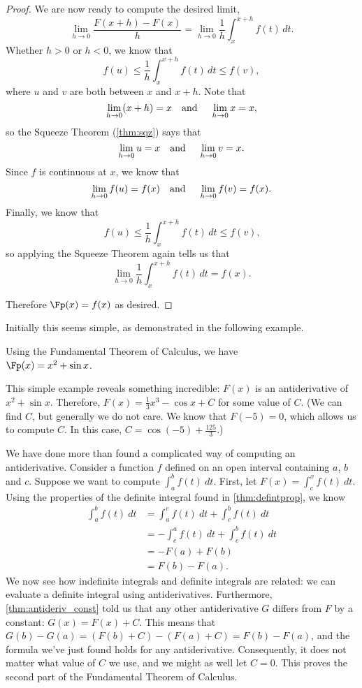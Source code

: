 \begin{proof}
We are now ready to compute the desired limit,
\[\lim_{h\to 0}\frac{F(x+h)-F(x)}{h}=\lim_{h\to 0}\frac1h\int_x^{x+h} f(t)\,dt.\]
Whether $h>0$ or $h<0$, we know that
\[f(u)\leq \frac1h\int_x^{x+h} f(t)\,dt\leq f(v),\]
where $u$ and $v$ are both between $x$ and $x+h$. Note that 
\[\lim_{h\to 0} (x+h)=x \text{\quad and \quad} \lim_{h\to 0} x=x,\]
so the Squeeze Theorem (\autoref{thm:sqz}) says that
\[\lim_{h\to 0}u=x \text{\quad and \quad} \lim_{h\to 0} v=x.\]
Since $f$ is continuous at $x$, we know that
\[\lim_{h\to 0} f(u)=f(x)\text{\quad and \quad} \lim_{h\to 0}f(v)=f(x).\]
Finally, we know that
\[f(u)\leq \frac1h \int_x^{x+h} f(t)\,dt\leq f(v)\text{,}\]
so applying the Squeeze Theorem again tells us that
\[\lim_{h\to 0}\frac1h\int_x^{x+h} f(t)\,dt=f(x).\] 

Therefore $\Fp(x)=f(x)$ as desired.
\end{proof}


Initially this seems simple, as demonstrated in the following example.

{Using the Fundamental Theorem of Calculus, we have\\
$\Fp(x) = x^2+\sin x$.}

This simple example reveals something incredible: $F(x)$ is an antiderivative of $x^2+\sin x$. Therefore, $F(x) = \frac13x^3-\cos x+C$ for some value of $C$. (We can find $C$, but generally we do not care. We know that $F(-5)=0$, which allows us to compute $C$. In this case, $C=\cos(-5)+\frac{125}3$.)

We have done more than found a complicated way of computing an antiderivative. Consider a function $f$ defined on an open interval containing $a$, $b$ and $c$. Suppose we want to compute $\int_a^b f(t)\ dt$. First, let $F(x) = \int_c^x f(t)\ dt$. Using the properties of the definite integral found in \autoref{thm:defintprop}, we know 
\begin{align*}
	\int_a^b f(t)\ dt
	&= \int_a^c f(t)\ dt + \int_c^b f(t)\ dt \\
	&= -\int_c^a f(t)\ dt + \int_c^b f(t)\ dt \\
	&=-F(a) + F(b)\\
	&= F(b) - F(a).
\end{align*}
We now see how indefinite integrals and definite integrals are related: we can evaluate a definite integral using antiderivatives.  Furthermore, \autoref{thm:antideriv_const} told us that any other antiderivative $G$ differs from $F$ by a constant: $G(x)=F(x)+C$.  This means that $G(b)-G(a)=(F(b)+C)-(F(a)+C)=F(b)-F(a)$, and the formula we've just found holds for any antiderivative.  Consequently, it does not matter what value of $C$ we use, and we might as well let $C=0$. This proves the second part of the Fundamental Theorem of Calculus.

